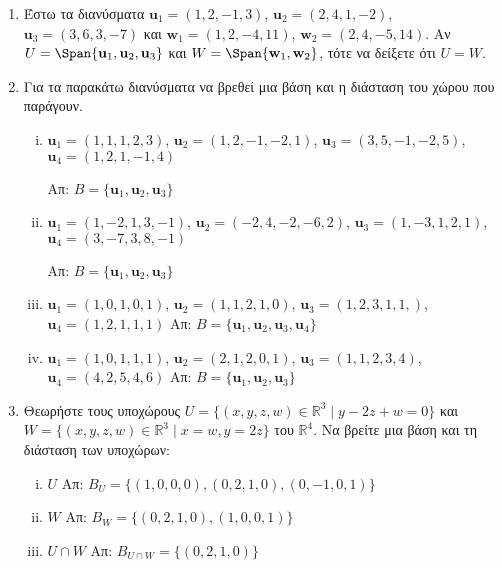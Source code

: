 \begin{enumerate}
  \item\label{ask:isoi} Έστω τα διανύσματα $ \mathbf{u}_{1} = (1,2,-1,3)$, 
    $\mathbf{u}_{2} = (2,4,1,-2)$, $ \mathbf{u} _{3} = (3,6,3,-7) $ και 
    $ \mathbf{w}_{1} = (1,2,-4,11)$, $ \mathbf{w}_{2} = (2,4,-5,14) $. 
    Αν $ U = \Span \{ \mathbf{u}_{1}, \mathbf{u}_{2}, \mathbf{u}_{3} \} $ και 
    $ W = \Span \{ \mathbf{w}_{1}, \mathbf{w}_{2} \} $, τότε να δείξετε ότι $ U=W $.

  \item\label{ask:parag2} Για τα παρακάτω διανύσματα να βρεθεί μια βάση και η διάσταση 
    του χώρου που παράγουν.
    \begin{enumerate}[(i)]
      \item $ \mathbf{u}_{1} = (1,1,1,2,3) $, $ \mathbf{u}_{2} = (1,2,-1,-2,1) $, 
        $ \mathbf{u} _{3} = (3,5,-1,-2,5) $, $ \mathbf{u}_{4} = (1,2,1,-1,4) $

        \hfill Απ: $ B = \{ \mathbf{u}_{1}, \mathbf{u}_{2}, \mathbf{u}_{3}\} $ 

      \item $ \mathbf{u}_{1} = (1,-2,1,3,-1) $, $ \mathbf{u}_{2} = (-2,4,-2,-6,2) $, $
        \mathbf{u}_{3} = (1,-3,1,2,1) $, $ \mathbf{u}_{4} = (3,-7,3,8,-1) $

        \hfill Απ: $ B = \{ \mathbf{u}_{1}, \mathbf{u}_{2}, \mathbf{u}_{3} \} $ 

      \item $ \mathbf{u}_{1} = (1,0,1,0,1) $, $ \mathbf{u}_{2} = (1,1,2,1,0) $, 
        $ \mathbf{u} _{3} = (1,2,3,1,1,) $, $ \mathbf{u}_{4} = (1,2,1,1,1) $
        \hfill Απ: $ B = \{ \mathbf{u}_{1}, \mathbf{u}_{2}, \mathbf{u}_{3}, 
        \mathbf{u}_{4} \} $ 

      \item $ \mathbf{u}_{1} = (1,0,1,1,1) $, $ \mathbf{u}_{2} = (2,1,2,0,1) $, 
        $ \mathbf{u} _{3} = (1,1,2,3,4) $, $ \mathbf{u}_{4} = (4,2,5,4,6) $
        \hfill Απ: $ B = \{ \mathbf{u}_{1}, \mathbf{u}_{2}, \mathbf{u}_{3} \} $ 
    \end{enumerate}

  \item Θεωρήστε τους υποχώρους 
    $ U = \{ (x,y,z,w) \in \mathbb{R}^{3} \mid y - 2z + w = 0 \} $ και 
    $ W = \{ (x,y,z,w) \in \mathbb{R}^{3} \mid x = w, y = 2z \} $ του 
    $\mathbb{R}^{4}$. Να βρείτε μια βάση και τη διάσταση των υποχώρων:
    \begin{enumerate}[(i)]
      \item $ U $ \hfill Απ: $ B_{U} = \{ (1,0,0,0), (0,2,1,0), (0,-1,0,1) \} $ 
      \item $ W $ \hfill Απ: $ B_{W} = \{ (0,2,1,0), (1,0,0,1) \} $ 
      \item $ U \cap W $ \hfill Απ: $ B_{U\cap W} = \{ (0,2,1,0) \} $ 
    \end{enumerate}	


\end{enumerate}
